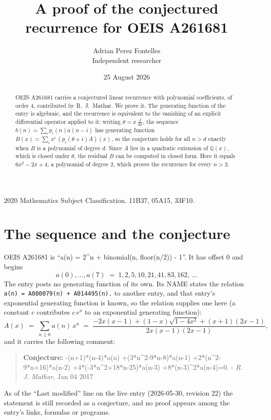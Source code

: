 \documentclass[11pt,a4paper]{article}
\title{A proof of the conjectured recurrence for OEIS A261681}
\author{Adrian Perez Fontelles\\ \small Independent researcher}
\date{25 August 2026}
\theoremstyle{plain}
\theoremstyle{definition}
\begin{document}
\maketitle

\begin{abstract}
OEIS A261681 carries a conjectured linear recurrence with polynomial coefficients, of
order 4, contributed by R.~J.~Mathar. We prove it. The generating function of the
entry is algebraic, and the recurrence is equivalent to the vanishing of an explicit
differential operator applied to it: writing $\theta=x\,\frac{d}{dx}$, the sequence
$b(n)=\sum_{i}p_{i}(n)a(n-i)$ has generating function
$B(x)=\sum_{i}x^{i}\,(p_{i}(\theta+i)A)(x)$, so the conjecture holds for all $n>d$ exactly
when $B$ is a polynomial of degree $d$. Since $A$ lies in a quadratic extension of
$\mathbb{Q}(x)$, which is closed under $\theta$, the residual $B$ can be computed in
closed form. Here it equals $6 x^{2} - 2 x + 4$, a polynomial of degree $2$, which proves
the recurrence for every $n>2$.
\end{abstract}

\noindent\small 2020 Mathematics Subject Classification. 11B37, 05A15, 33F10.\normalsize

\section{The sequence and the conjecture}

OEIS A261681 is ``a(n) = 2\^{}n + binomial(n, floor(n/2)) - 1''. It has offset $0$ and begins
\[
a(0),\dots,a(7)\;=\;1, 2, 5, 10, 21, 41, 83, 162,\ \dots
\]
The entry posts no generating function of its own. Its NAME states the
relation \texttt{a(n) = A000079(n) + A014495(n).} to another entry, and that entry's exponential generating
function is known, so the relation supplies one here (a constant $c$ contributes
$c\,e^{x}$ to an exponential generating function):
\begin{equation}\label{eq:gf}
A(x)\;=\;\sum_{n\ge 0} a(n)\,x^{n}\;=\;\frac{- 2 x \left(x - 1\right) + \left(1 - x\right) \sqrt{1 - 4 x^{2}} + \left(x + 1\right) \left(2 x - 1\right)}{2 x \left(x - 1\right) \left(2 x - 1\right)} ,
\end{equation}
and it carries the following comment:
\begin{quote}\small
\textbf{Conjecture:} -(n+1)*(n-4)*a(n) +(3*n\^{}2-9*n-8)*a(n-1) +2*(n\^{}2-9*n+16)*a(n-2) +4*(-3*n\^{}2+18*n-25)*a(n-3) +8*(n-3)\^{}2*a(n-4)=0. - \emph{R. J. Mathar}, Jan 04 2017
\end{quote}
As of the ``Last modified'' line on the live entry (2026-05-30, revision 22) the
statement is still recorded as a conjecture, and no proof appears among the entry's links,
formulas or programs.
\end{document}
